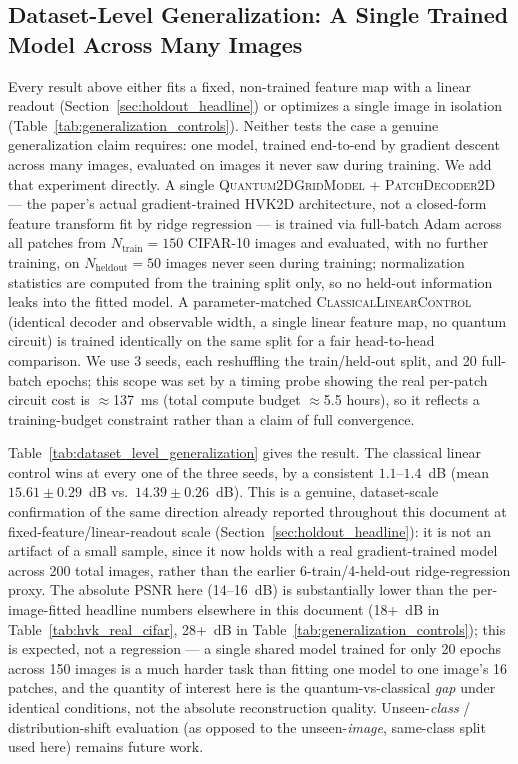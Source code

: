 \documentclass[11pt]{article}
\begin{document}
\subsection{Dataset-Level Generalization: A Single Trained Model Across Many Images}
\label{sec:dataset_level_generalization}
Every result above either fits a fixed, non-trained feature map with a linear readout (Section~\ref{sec:holdout_headline}) or optimizes a single image in isolation (Table~\ref{tab:generalization_controls}). Neither tests the case a genuine generalization claim requires: one model, trained end-to-end by gradient descent across many images, evaluated on images it never saw during training. We add that experiment directly. A single \textsc{Quantum2DGridModel} + \textsc{PatchDecoder2D} --- the paper's actual gradient-trained HVK2D architecture, not a closed-form feature transform fit by ridge regression --- is trained via full-batch Adam across all patches from $N_{\text{train}}=150$ CIFAR-10 images and evaluated, with no further training, on $N_{\text{heldout}}=50$ images never seen during training; normalization statistics are computed from the training split only, so no held-out information leaks into the fitted model. A parameter-matched \textsc{ClassicalLinearControl} (identical decoder and observable width, a single linear feature map, no quantum circuit) is trained identically on the same split for a fair head-to-head comparison. We use 3 seeds, each reshuffling the train/held-out split, and 20 full-batch epochs; this scope was set by a timing probe showing the real per-patch circuit cost is $\approx$137~ms (total compute budget $\approx$5.5 hours), so it reflects a training-budget constraint rather than a claim of full convergence.

Table~\ref{tab:dataset_level_generalization} gives the result. The classical linear control wins at every one of the three seeds, by a consistent $1.1$--$1.4$~dB (mean $15.61\pm0.29$~dB vs.\ $14.39\pm0.26$~dB). This is a genuine, dataset-scale confirmation of the same direction already reported throughout this document at fixed-feature/linear-readout scale (Section~\ref{sec:holdout_headline}): it is not an artifact of a small sample, since it now holds with a real gradient-trained model across 200 total images, rather than the earlier 6-train/4-held-out ridge-regression proxy. The absolute PSNR here (14--16~dB) is substantially lower than the per-image-fitted headline numbers elsewhere in this document (18+~dB in Table~\ref{tab:hvk_real_cifar}, 28+~dB in Table~\ref{tab:generalization_controls}); this is expected, not a regression --- a single shared model trained for only 20 epochs across 150 images is a much harder task than fitting one model to one image's 16 patches, and the quantity of interest here is the quantum-vs-classical \emph{gap} under identical conditions, not the absolute reconstruction quality. Unseen-\emph{class} / distribution-shift evaluation (as opposed to the unseen-\emph{image}, same-class split used here) remains future work.
\end{document}
